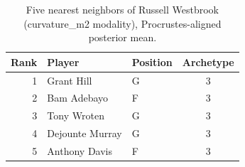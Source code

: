 \begin{table}[htbp]
  \centering\small
  \begin{tabular}{rllc}
    \toprule
    Rank & Player & Position & Archetype \\
    \midrule
    1 & Grant Hill & G & 3 \\
    2 & Bam Adebayo & F & 3 \\
    3 & Tony Wroten & G & 3 \\
    4 & Dejounte Murray & G & 3 \\
    5 & Anthony Davis & F & 3 \\
    \bottomrule
  \end{tabular}
  \caption{Five nearest neighbors of Russell Westbrook (curvature_m2 modality), Procrustes-aligned posterior mean.}
  \label{tab:Russell_Westbrook_neighbors_curvature_m2}
\end{table}


